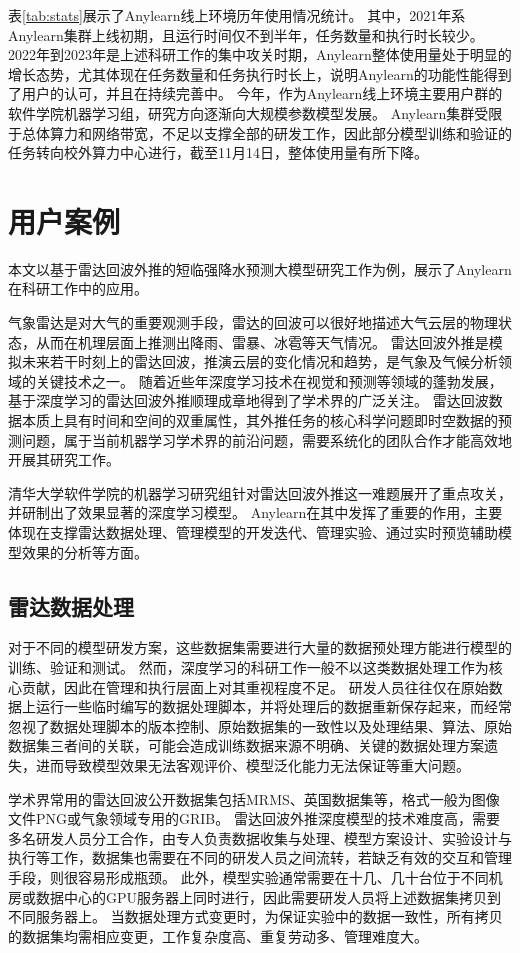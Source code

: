 表\ref{tab:stats}展示了Anylearn线上环境历年使用情况统计。
其中，2021年系Anylearn集群上线初期，且运行时间仅不到半年，任务数量和执行时长较少。
2022年到2023年是上述科研工作的集中攻关时期，Anylearn整体使用量处于明显的增长态势，尤其体现在任务数量和任务执行时长上，说明Anylearn的功能性能得到了用户的认可，并且在持续完善中。
今年，作为Anylearn线上环境主要用户群的软件学院机器学习组，研究方向逐渐向大规模参数模型发展。
Anylearn集群受限于总体算力和网络带宽，不足以支撑全部的研发工作，因此部分模型训练和验证的任务转向校外算力中心进行，截至11月14日，整体使用量有所下降。


\section{用户案例}

本文以基于雷达回波外推的短临强降水预测大模型研究工作为例，展示了Anylearn在科研工作中的应用。

气象雷达是对大气的重要观测手段，雷达的回波可以很好地描述大气云层的物理状态，从而在机理层面上推测出降雨、雷暴、冰雹等天气情况。
雷达回波外推是模拟未来若干时刻上的雷达回波，推演云层的变化情况和趋势，是气象及气候分析领域的关键技术之一。
随着近些年深度学习技术在视觉和预测等领域的蓬勃发展，基于深度学习的雷达回波外推顺理成章地得到了学术界的广泛关注\cite{Zha23}。
雷达回波数据本质上具有时间和空间的双重属性，其外推任务的核心科学问题即时空数据的预测问题，属于当前机器学习学术界的前沿问题，需要系统化的团队合作才能高效地开展其研究工作。

清华大学软件学院的机器学习研究组针对雷达回波外推这一难题展开了重点攻关，并研制出了效果显著的深度学习模型。
Anylearn在其中发挥了重要的作用，主要体现在支撑雷达数据处理、管理模型的开发迭代、管理实验、通过实时预览辅助模型效果的分析等方面。

\subsection{雷达数据处理}
对于不同的模型研发方案，这些数据集需要进行大量的数据预处理方能进行模型的训练、验证和测试。
然而，深度学习的科研工作一般不以这类数据处理工作为核心贡献，因此在管理和执行层面上对其重视程度不足。
研发人员往往仅在原始数据上运行一些临时编写的数据处理脚本，并将处理后的数据重新保存起来，而经常忽视了数据处理脚本的版本控制、原始数据集的一致性以及处理结果、算法、原始数据集三者间的关联，可能会造成训练数据来源不明确、关键的数据处理方案遗失，进而导致模型效果无法客观评价、模型泛化能力无法保证等重大问题。

学术界常用的雷达回波公开数据集包括MRMS\cite{Smi16}、英国数据集\cite{Rav21}等，格式一般为图像文件PNG或气象领域专用的GRIB。
雷达回波外推深度模型的技术难度高，需要多名研发人员分工合作，由专人负责数据收集与处理、模型方案设计、实验设计与执行等工作，数据集也需要在不同的研发人员之间流转，若缺乏有效的交互和管理手段，则很容易形成瓶颈。
此外，模型实验通常需要在十几、几十台位于不同机房或数据中心的GPU服务器上同时进行，因此需要研发人员将上述数据集拷贝到不同服务器上。
当数据处理方式变更时，为保证实验中的数据一致性，所有拷贝的数据集均需相应变更，工作复杂度高、重复劳动多、管理难度大。

